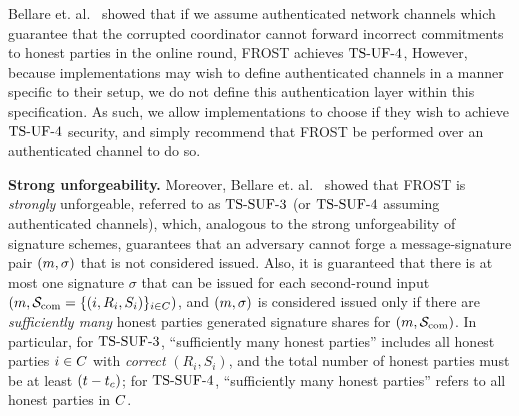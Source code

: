 Bellare et. al.~\cite{BellareCKMTZ22} showed that if we assume authenticated network channels which guarantee that the corrupted coordinator cannot forward incorrect commitments to honest parties in the online round,
FROST achieves $\mathrm{TS}\mbox{-}\mathrm{UF}\mbox{-}{4}$,
However, because implementations may wish to define authenticated channels in a manner specific to their setup,
we do not define this authentication layer within this specification.
As such,
we allow implementations to choose if they wish to achieve $\mathrm{TS}\mbox{-}\mathrm{UF}\mbox{-}{4}$ security,
and simply recommend that FROST be performed over an authenticated channel to do so.

\medskip
\textbf{Strong unforgeability.} Moreover, Bellare et. al.~\cite{BellareCKMTZ22} showed that FROST is \emph{strongly} unforgeable, referred to as $\mathrm{TS}\mbox{-}\mathrm{SUF}\mbox{-}{3}$ (or $\mathrm{TS}\mbox{-}\mathrm{SUF}\mbox{-}{4}$ assuming authenticated channels), which, analogous to the strong unforgeability of signature schemes, guarantees that an adversary cannot forge a message-signature pair $(m,\sigma)$ that is not considered issued.
Also, it is guaranteed that there is at most one signature $\sigma$ that can be issued for each second-round input $(m, \mathcal{S}_{\rm com}=\{ (i, R_{i}, S_{i})\}_{i \in C})$, and $(m, \sigma)$ is considered issued only if there are \emph{sufficiently many} honest parties generated signature shares for $(m, \mathcal{S}_{\rm com})$.
In particular, for $\mathrm{TS}\mbox{-}\mathrm{SUF}\mbox{-}{3}$, ``sufficiently many honest parties'' includes all honest parties $i\in C$ with \emph{correct} $(R_{i}, S_{i})$, and the total number of honest parties must be at least $(t - t_c)$; for $\mathrm{TS}\mbox{-}\mathrm{SUF}\mbox{-}{4}$, ``sufficiently many honest parties'' refers to all honest parties in $C$.




